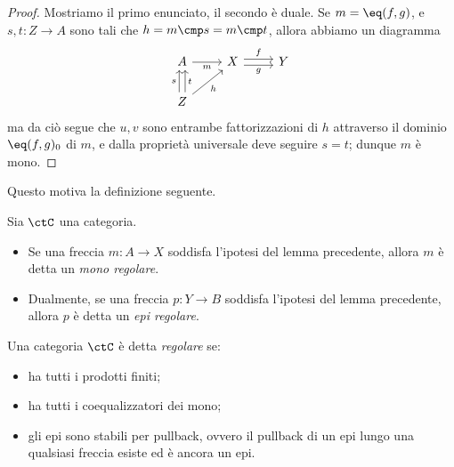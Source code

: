 \begin{proof}
	Mostriamo il primo enunciato, il secondo è duale. Se \(m = \eq(f,g)\), e \(s,t \colon Z \to A\) sono tali che \(h = m \cmp s = m \cmp t\), allora abbiamo un diagramma
	\[\begin{tikzcd}[ampersand replacement=\&]
			A \& X \& Y \\
			Z
			\arrow["m"', from=1-1, to=1-2]
			\arrow["f", shift left, from=1-2, to=1-3]
			\arrow["g"', shift right, from=1-2, to=1-3]
			\arrow["s", shift left, from=2-1, to=1-1]
			\arrow["t"', shift right, from=2-1, to=1-1]
			\arrow["h"', from=2-1, to=1-2]
		\end{tikzcd}\]
	ma da ciò segue che \(u,v\) sono entrambe fattorizzazioni di \(h\)	attraverso il dominio \(\eq(f,g)_0\) di \(m\), e dalla proprietà universale deve seguire \(s=t\); dunque \(m\) è mono.
\end{proof}
Questo motiva la definizione seguente.
\begin{definition}\label{def_epi_mono_regolari}
	Sia \(\ctC\) una	categoria.
	\begin{itemize}
		\item Se una freccia \(m \colon A \to X\) soddisfa l'ipotesi del lemma precedente, allora \(m\) è detta un \emph{mono regolare}.
		\item Dualmente, se una freccia \(p \colon Y \to B\)	soddisfa l'ipotesi del lemma precedente, allora \(p\) è detta un \emph{epi regolare}.
	\end{itemize}
\end{definition}
\begin{definition}\label{def_cat_regolare}
	\color{red}
	Una categoria \(\ctC\) è detta \emph{regolare} se:
	\begin{itemize}
		\item ha tutti i prodotti finiti;
		\item ha tutti i coequalizzatori dei mono;
		\item gli epi sono stabili per pullback, ovvero il pullback di un epi lungo una qualsiasi freccia esiste ed è ancora un epi.
	\end{itemize}
\end{definition}

